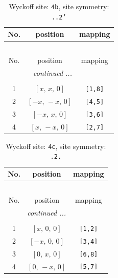 \documentclass[fleqn,8pt]{jsarticle}
\begin{document}
\begin{longtable}{ccc}
\caption{Wyckoff site: {\tt 4b}, site symmetry: {\tt ..2'}}
 \\
 \hline \hline
No. & position & mapping \\ \hline \endfirsthead

\multicolumn{2}{l}{\tablename\ \thetable{}} \\
 \hline \hline
No. & position & mapping \\ \hline \endhead

 \hline \hline
\multicolumn{2}{r}{\footnotesize\it continued ...} \\ \endfoot

 \hline \hline
\multicolumn{2}{r}{} \\ \endlastfoot

1 & $\left[ x,\, x,\, 0 \right]$ & {\tt [1,8]} \\ \hline
2 & $\left[ - x,\, - x,\, 0 \right]$ & {\tt [4,5]} \\ \hline
3 & $\left[ - x,\, x,\, 0 \right]$ & {\tt [3,6]} \\ \hline
4 & $\left[ x,\, - x,\, 0 \right]$ & {\tt [2,7]} \\
\end{longtable}
\renewcommand{\arraystretch}{1.2}
\begin{longtable}{ccc}
\caption{Wyckoff site: {\tt 4c}, site symmetry: {\tt .2.}}
 \\
 \hline \hline
No. & position & mapping \\ \hline \endfirsthead

\multicolumn{2}{l}{\tablename\ \thetable{}} \\
 \hline \hline
No. & position & mapping \\ \hline \endhead

 \hline \hline
\multicolumn{2}{r}{\footnotesize\it continued ...} \\ \endfoot

 \hline \hline
\multicolumn{2}{r}{} \\ \endlastfoot

1 & $\left[ x,\, 0,\, 0 \right]$ & {\tt [1,2]} \\ \hline
2 & $\left[ - x,\, 0,\, 0 \right]$ & {\tt [3,4]} \\ \hline
3 & $\left[ 0,\, x,\, 0 \right]$ & {\tt [6,8]} \\ \hline
4 & $\left[ 0,\, - x,\, 0 \right]$ & {\tt [5,7]} \\
\end{longtable}
\renewcommand{\arraystretch}{1.2}
\end{document}
